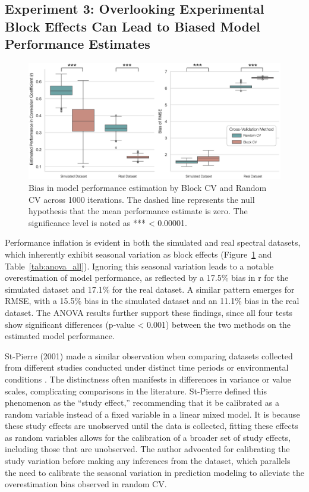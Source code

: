 \subsection{Experiment 3: Overlooking Experimental Block Effects Can Lead to Biased Model Performance Estimates}

\begin{figure}[H]
    \centering
    \includegraphics[width=1\textwidth]{fig_8.jpg}
    \caption{Bias in model performance estimation by Block CV and Random CV across 1000 iterations. The dashed line represents the null hypothesis that the mean performance estimate is zero. The significance level is noted as *** < 0.00001.}
    \label{fig:s3_results}
\end{figure}

Performance inflation is evident in both the simulated and real spectral datasets, which inherently exhibit seasonal variation as block effects (Figure~\ref{fig:s3_results} and Table~\ref{tab:anova_all}). Ignoring this seasonal variation leads to a notable overestimation of model performance, as reflected by a 17.5\% bias in r for the simulated dataset and 17.1\% for the real dataset. A similar pattern emerges for RMSE, with a 15.5\% bias in the simulated dataset and an 11.1\% bias in the real dataset. The ANOVA results further support these findings, since all four tests show significant differences (p-value < 0.001) between the two methods on the estimated model performance.

St-Pierre (2001) made a similar observation when comparing datasets collected from different studies conducted under distinct time periods or environmental conditions \citep{st-pierre_invited_2001}. The distinctness often manifests in differences in variance or value scales, complicating comparisons in the literature. St-Pierre defined this phenomenon as the “study effect,” recommending that it be calibrated as a random variable instead of a fixed variable in a linear mixed model. It is because these study effects are unobserved until the data is collected, fitting these effects as random variables allows for the calibration of a broader set of study effects, including those that are unobserved. The author advocated for calibrating the study variation before making any inferences from the dataset, which parallels the need to calibrate the seasonal variation in prediction modeling to alleviate the overestimation bias observed in random CV.

